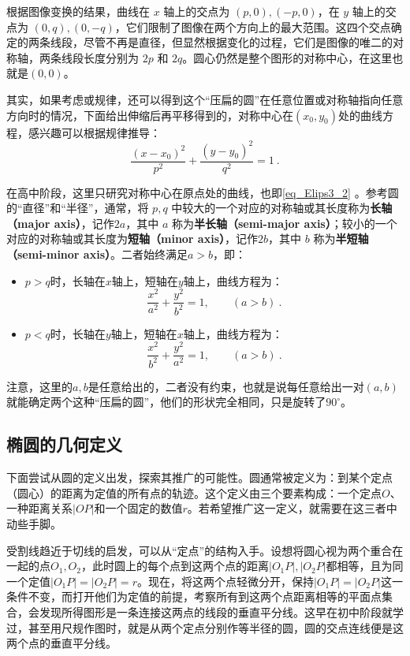根据图像变换的结果，曲线在 $x$ 轴上的交点为 $(p, 0), (-p, 0)$，在 $y$ 轴上的交点为 $(0, q), (0, -q)$，它们限制了图像在两个方向上的最大范围。这四个交点确定的两条线段，尽管不再是直径，但显然根据变化的过程，它们是图像的唯二的对称轴，两条线段长度分别为 $2p$ 和 $2q$。圆心仍然是整个图形的对称中心，在这里也就是$(0,0)$。

其实，如果考虑或规律，还可以得到这个“压扁的圆”在任意位置或对称轴指向任意方向时的情况，下面给出伸缩后再平移得到的，对称中心在$(x_0,y_0)$处的曲线方程，感兴趣可以根据规律推导：
\begin{equation}
\frac{(x-x_0)^2}{p^2} + \frac{(y-y_0)^2}{q^2} = 1~.
\end{equation}

在高中阶段，这里只研究对称中心在原点处的曲线，也即\autoref{eq_Elips3_2} 。参考圆的“直径”和“半径”，通常，将 $p, q$ 中较大的一个对应的对称轴或其长度称为\textbf{长轴（major axis）}，记作$2a$，其中 $a$ 称为\textbf{半长轴（semi-major axis）}；较小的一个对应的对称轴或其长度为\textbf{短轴（minor axis）}，记作$2b$，其中 $b$ 称为\textbf{半短轴（semi-minor axis）}。二者始终满足$a>b$，即：
\begin{itemize}
\item $p>q$时，长轴在$x$轴上，短轴在$y$轴上，曲线方程为：
\begin{equation}\label{eq_Elips3_5}
\frac{x^2}{a^2} + \frac{y^2}{b^2} = 1,\qquad(a>b)~.
\end{equation}
\item $p<q$时，长轴在$y$轴上，短轴在$x$轴上，曲线方程为：
\begin{equation}\label{eq_Elips3_7}
\frac{x^2}{b^2} + \frac{y^2}{a^2} = 1,\qquad(a>b)~.
\end{equation}
\end{itemize}

注意，这里的$a,b$是任意给出的，二者没有约束，也就是说每任意给出一对$(a,b)$就能确定两个这种“压扁的圆”，他们的形状完全相同，只是旋转了$90^\circ$。

\subsection{椭圆的几何定义}

下面尝试从圆的定义出发，探索其推广的可能性。圆通常被定义为：到某个定点（圆心）的距离为定值的所有点的轨迹。这个定义由三个要素构成：一个定点$O$、一种距离关系$|OP|$和一个固定的数值$r$。若希望推广这一定义，就需要在这三者中动些手脚。

受割线趋近于切线的启发，可以从“定点”的结构入手。设想将圆心视为两个重合在一起的点$O_1,O_2$，此时圆上的每个点到这两个点的距离$|O_1P|,|O_2P|$都相等，且为同一个定值$|O_1P|=|O_2P|=r$。现在，将这两个点轻微分开，保持$|O_1P|=|O_2P|$这一条件不变，而打开他们为定值的前提，考察所有到这两个点距离相等的平面点集合，会发现所得图形是一条连接这两点的线段的垂直平分线。这早在初中阶段就学过，甚至用尺规作图时，就是从两个定点分别作等半径的圆，圆的交点连线便是这两个点的垂直平分线。


